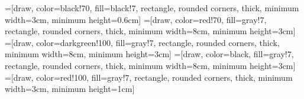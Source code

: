 \DeclareMathOperator*{\T}{\mathbf{T}}
\DeclareMathOperator*{\RX}{\mathbf{R}_{X}}
\DeclareMathOperator*{\RY}{\mathbf{R}_{Y}}
\DeclareMathOperator*{\RZ}{\mathbf{R}_{Z}}

\def\N{\ensuremath{\mathbb{N}}\xspace}

\def\B{\ensuremath{\mathcal{B}}\xspace}
\def\F{\ensuremath{\mathcal{F}}\xspace}
\def\V{\ensuremath{\mathcal{V}}\xspace}
\def\F{\ensuremath{\mathcal{F}}\xspace}
\def\M{\ensuremath{\mathcal{M}}\xspace}
\def\U{\ensuremath{\mathcal{U}}\xspace}
\def\D{\ensuremath{\mathcal{D}}\xspace}
\def\K{\ensuremath{\mathcal{K}}\xspace}
\def\L{\ensuremath{\mathbf{L}}\xspace}

\def\M{\ensuremath{\mathbf{M}}\xspace}
\def\A{\ensuremath{\mathbf{A}}\xspace}
\def\G{\ensuremath{\mathbf{G}}\xspace}
\def\H{\ensuremath{\mathbf{H}}\xspace}

\def\Line{\ensuremath{\mathbf{L}}\xspace}

\def\PXZ{\ensuremath{\mathcal{P}_{xz}}\xspace}

\DeclareMathOperator*{\argmin}{\arg\!\min\ }
\DeclareMathOperator{\conv}{\mathbf{conv}}


\newcommand{\comment}[1]{\ignorespaces {\bf{\textcolor{red}{Comment} :
}{\textcolor{red}{#1}}} }

\newcommand*\todo[1]{\stepcounter{todoCtr}%
        {\bf\textcolor{red}{TODO} \#\arabic{todoCtr}: }%
        \textcolor{red}{#1} }


\usepackage{xspace}
\usetikzlibrary{patterns}
=[draw, color=black!70, fill=black!7, rectangle, rounded
corners, thick, minimum width=3cm, minimum height=0.6cm]
=[draw, color=red!70, fill=gray!7, rectangle, rounded
corners, thick, minimum width=8cm, minimum height=3cm]
=[draw, color=darkgreen!100, fill=gray!7, rectangle, rounded
corners, thick, minimum width=8cm, minimum height=3cm]
=[draw, color=black, fill=gray!7, rectangle, rounded
corners, thick, minimum width=8cm, minimum height=3cm]
=[draw, color=red!100, fill=gray!7, rectangle, rounded
corners, thick, minimum width=3cm, minimum height=1cm]

